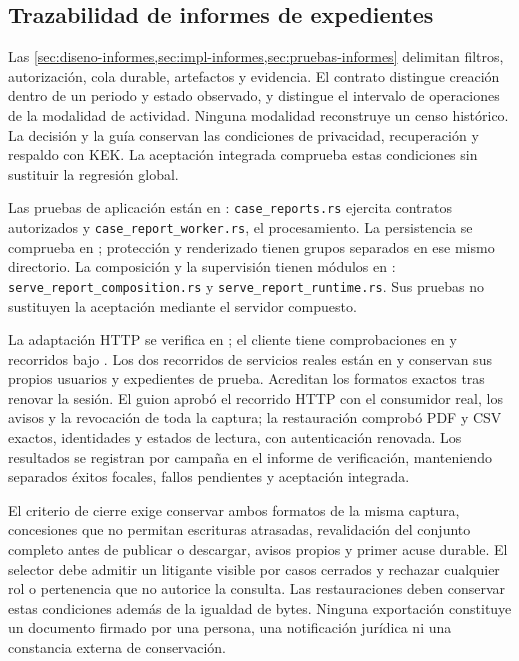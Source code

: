 \subsection{Trazabilidad de informes de expedientes}\label{anexo:informes}

Las \cref{sec:diseno-informes,sec:impl-informes,sec:pruebas-informes} delimitan
filtros, autorización, cola durable, artefactos y evidencia. El contrato
 distingue creación dentro de un periodo y
estado observado, y distingue el intervalo de operaciones de la modalidad de
actividad. Ninguna modalidad reconstruye un censo histórico. La decisión
 y la guía
 conservan las condiciones de privacidad,
recuperación y respaldo con KEK. La aceptación integrada comprueba estas
condiciones sin sustituir la regresión global.

Las pruebas de aplicación están en :
\texttt{case\_reports.rs} ejercita contratos autorizados y
\texttt{case\_report\_worker.rs}, el procesamiento. La persistencia se comprueba
en ; protección y
renderizado tienen grupos separados en ese mismo directorio. La composición y
la supervisión tienen módulos en :
\texttt{serve\_report\_composition.rs} y \texttt{serve\_report\_runtime.rs}.
Sus pruebas no sustituyen la aceptación mediante el servidor compuesto.

La adaptación HTTP se verifica en
; el cliente tiene comprobaciones
en  y recorridos bajo
. Los dos recorridos de servicios reales están en
 y conservan sus propios usuarios
y expedientes de prueba. Acreditan los formatos exactos tras renovar la sesión.
El guion  aprobó el recorrido HTTP
con el consumidor real, los avisos y la revocación de toda la captura; la
restauración comprobó PDF y CSV exactos, identidades y estados de lectura, con
autenticación renovada. Los resultados se
registran por campaña en el informe de verificación, manteniendo separados
éxitos focales, fallos pendientes y aceptación integrada.

El criterio de cierre exige conservar ambos formatos de la misma captura,
concesiones que no permitan escrituras atrasadas, revalidación del conjunto
completo antes de publicar o descargar, avisos propios y primer acuse durable.
El selector debe admitir un litigante visible por casos cerrados y rechazar
cualquier rol o pertenencia que no autorice la consulta. Las restauraciones
deben conservar estas condiciones además de la igualdad de bytes. Ninguna
exportación constituye un documento firmado por una persona, una notificación
jurídica ni una constancia externa de conservación.

